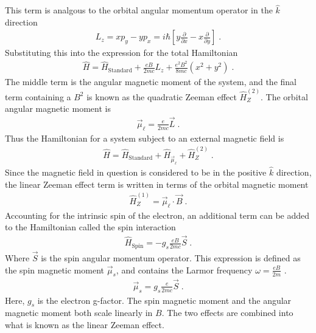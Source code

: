         \noindent This term is analgous to the orbital angular momentum operator in the $\hat{k}$ direction 
        \begin{align}
            L_z = xp_y - yp_x = i\hbar \left[y \frac{\partial}{\partial x} - x \frac{\partial}{\partial y} \right]\;.
        \end{align}
        \noindent Substituting this into the expression for the total Hamiltonian
        \begin{align}
            \hat{H} =  \hat{H}_{\text{Standard}} + \frac{eB}{2mc} L_z + \frac{e^2B^2}{8mc} \left(x^2 + y^2\right)\;.
        \end{align}
        \noindent The middle term is the angular magnetic moment of the system, and the final term containing a $B^2$ is known as the quadratic Zeeman effect $\hat{H}_Z^{(2)}$. The orbital angular magnetic moment is \cite{Basdevant_Dalibard_2002}
        \begin{align}
            \vec{\mu}_\ell = \frac{e}{2mc} \vec{L}\;.
        \end{align}
        \noindent Thus the Hamiltonian for a system subject to an external magnetic field is
        \begin{align}
            \hat{H} =  \hat{H}_{\text{Standard}} + \hat{H}_{\vec{\mu}_\ell} + \hat{H}_Z^{(2)} \;.
        \end{align}
        \noindent Since the magnetic field in question is considered to be in the positive $\hat{k}$ direction, the linear Zeeman effect term is written in terms of the orbital magnetic moment 
        \begin{align}
            \hat{H}_Z^{(1)} = \vec{\mu}_\ell \cdot \vec{B}\;.
        \end{align}
        \noindent Accounting for the intrinsic spin of the electron, an additional term can be added to the Hamiltonian called the spin interaction \cite{Sakurai_Napolitano_2020}
        \begin{align}
            \hat{H}_{\text{Spin}} = -g_s \frac{eB}{2mc} \vec{S}\;.
        \end{align}
        \noindent Where $\vec{S}$ is the spin angular momentum operator. This expression is defined as the spin magnetic moment $\vec{\mu}_s$, and contains the Larmor frequency $\omega = \frac{eB}{2m}$ \cite{Foot_2005}.
        \begin{align}
            \vec{\mu}_s = g_s \frac{e}{2mc} \vec{S}\;.
        \end{align}
        \noindent Here, $g_s$ is the electron g-factor. The spin magnetic moment and the angular magnetic moment both scale linearly in $B$. The two effects are combined into what is known as the linear Zeeman effect.
